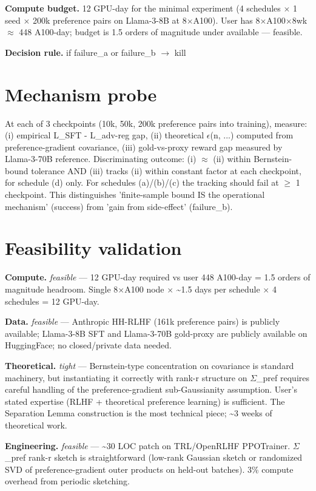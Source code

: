 \documentclass[10pt,a4paper]{article}
\begin{document}
\begin{tcolorbox}[colback=bgskill, colframe=cblue, title=\textbf{NoveltySkill — Idea Card (L3 Oral-Ready)}, breakable]
\textbf{Compute budget.} 12 GPU-day for the minimal experiment (4 schedules $\times$ 1 seed $\times$ 200k preference pairs on Llama-3-8B at 8$\times$A100). User has 8$\times$A100$\times$8wk $\approx$ 448 A100-day; budget is 1.5 orders of magnitude under available --- feasible.

\textbf{Decision rule.} if failure\_a or failure\_b $\to$ kill

\section*{Mechanism probe}
At each of 3 checkpoints (10k, 50k, 200k preference pairs into training), measure: (i) empirical L\_SFT - L\_adv-reg gap, (ii) theoretical $\epsilon$(n, ...) computed from preference-gradient covariance, (iii) gold-vs-proxy reward gap measured by Llama-3-70B reference. Discriminating outcome: (i) $\approx$ (ii) within Bernstein-bound tolerance AND (iii) tracks (ii) within constant factor at each checkpoint, for schedule (d) only. For schedules (a)/(b)/(c) the tracking should fail at $\ge$ 1 checkpoint. This distinguishes 'finite-sample bound IS the operational mechanism' (success) from 'gain from side-effect' (failure\_b).

\section*{Feasibility validation}
\textbf{Compute.} \emph{ feasible } — 12 GPU-day required vs user 448 A100-day = 1.5 orders of magnitude headroom. Single 8$\times$A100 node $\times$ \textasciitilde{}1.5 days per schedule $\times$ 4 schedules = 12 GPU-day.

\textbf{Data.} \emph{ feasible } — Anthropic HH-RLHF (161k preference pairs) is publicly available; Llama-3-8B SFT and Llama-3-70B gold-proxy are publicly available on HuggingFace; no closed/private data needed.

\textbf{Theoretical.} \emph{ tight } — Bernstein-type concentration on covariance is standard machinery, but instantiating it correctly with rank-r structure on $\Sigma$\_pref requires careful handling of the preference-gradient sub-Gaussianity assumption. User's stated expertise (RLHF + theoretical preference learning) is sufficient. The Separation Lemma construction is the most technical piece; \textasciitilde{}3 weeks of theoretical work.

\textbf{Engineering.} \emph{ feasible } — \textasciitilde{}30 LOC patch on TRL/OpenRLHF PPOTrainer. $\Sigma$\_pref rank-r sketch is straightforward (low-rank Gaussian sketch or randomized SVD of preference-gradient outer products on held-out batches). 3\% compute overhead from periodic sketching.


\end{tcolorbox}
\end{document}
